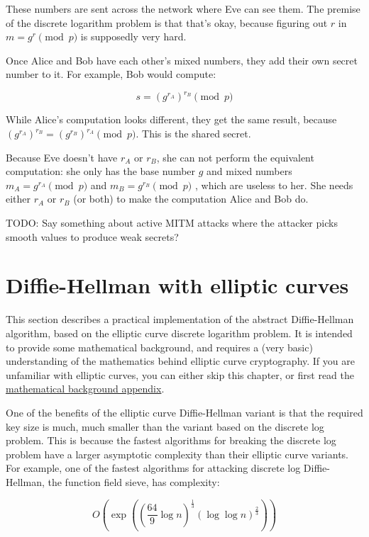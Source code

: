\documentclass[11pt,ebook,table,dvipsnames]{memoir}
\begin{document}
These numbers are sent across the network where Eve can see them. The
premise of the discrete logarithm problem is that that's okay, because
figuring out $r$ in $m = g^r \pmod{p}$ is supposedly very hard.

Once Alice and Bob have each other's mixed numbers, they add their own
secret number to it. For example, Bob would compute:

\begin{equation}
s = (g^{r_A})^{r_B} \pmod{p}
\end{equation}

While Alice's computation looks different, they get the same result,
because $(g^{r_A})^{r_B} = (g^{r_B})^{r_A} \pmod{p}$. This is the
shared secret.

Because Eve doesn't have $r_A$ or $r_B$, she can not perform the
equivalent computation: she only has the base number $g$ and mixed
numbers $m_A = g^{r_A} \pmod{p}$ and $m_B = g^{r_B} \pmod{p}$ , which
are useless to her. She needs either $r_A$ or $r_B$ (or both) to
make the computation Alice and Bob do.

TODO: Say something about active MITM attacks where the attacker
picks smooth values to produce weak secrets?
\section{Diffie-Hellman with elliptic curves}
\label{sec-2-4-4}

This section describes a practical implementation of the abstract
Diffie-Hellman algorithm, based on the elliptic curve discrete
logarithm problem. It is intended to provide some mathematical
background, and requires a (very basic) understanding of the
mathematics behind elliptic curve cryptography. If you are unfamiliar
with elliptic curves, you can either skip this chapter, or first read
the \hyperref[Elliptic-curves]{mathematical background appendix}.

One of the benefits of the elliptic curve Diffie-Hellman variant is
that the required key size is much, much smaller than the variant
based on the discrete log problem. This is because the fastest
algorithms for breaking the discrete log problem have a larger
asymptotic complexity than their elliptic curve variants. For example,
one of the fastest algorithms for attacking discrete log
Diffie-Hellman, the function field sieve, has complexity:

\[
O\left(\exp\left(\left(\frac{64}{9} \log n\right)^{\frac{1}{3}} (\log \log n)^{\frac{2}{3}}\right)\right)
\]
\end{document}
